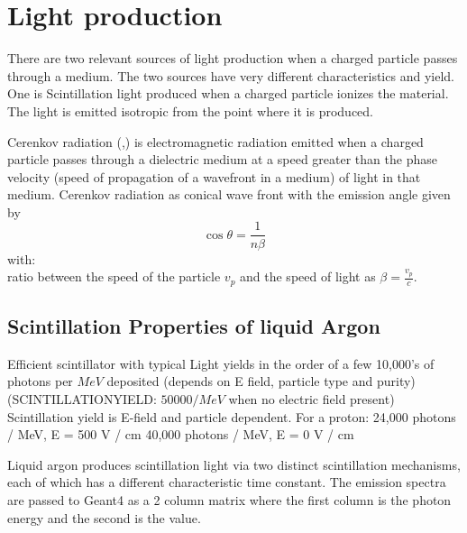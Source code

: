 \documentclass{article}
\begin{document}
  \section{Light production}
  There are two relevant sources of light production when a charged particle passes through a medium. The two sources have very different characteristics and yield. One is Scintillation light produced when a
  charged particle ionizes the material. The light is emitted isotropic from the point where it is produced. 
  

  
  Cerenkov radiation (\cite{ref:pdg},\cite{ref:wikipedia}) is electromagnetic radiation emitted when a charged particle passes through a dielectric medium at a speed greater than the phase velocity
  (speed of propagation of a wavefront in a medium) of light in that medium.
  Cerenkov radiation as conical wave front with the emission angle given by 
   \begin{equation}
  \cos \theta ={\frac {1}{n\beta }}
   \end{equation}
  with:\\
   ratio between the speed of the particle $v_p$ and the speed of light as $\beta =\frac{v_p}{c}$.


  \subsection{Scintillation Properties of liquid Argon}

  Efficient scintillator with typical Light yields in the order of a few 10,000’s of photons per $MeV$  deposited (depends on E field, particle type and purity)
  (SCINTILLATIONYIELD: $50000/MeV$ when no electric field present)
Scintillation yield is E-field and particle
dependent. For a proton:
24,000 photons / MeV, E = 500 V / cm
40,000 photons / MeV, E = 0 V / cm
  
  Liquid argon produces scintillation light via two distinct scintillation mechanisms, each
  of which has a different characteristic time constant. The emission spectra are passed to Geant4
  as a 2 column matrix where the first column is the photon energy and the second is the value.
 
\end{document}
